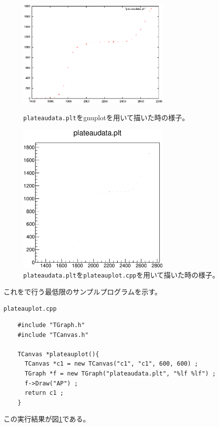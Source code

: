 \begin{figure}[htbp]
 \begin{minipage}{0.47\hsize}
  \begin{center}
   \includegraphics[width = 75mm]{./picture/plateaugnuplot.eps}
  \end{center}
  \caption{\texttt{plateaudata.plt}をgnuplotを用いて描いた時の様子。}
  \label{Fig:plateaugnuplot}
 \end{minipage}
 \begin{minipage}{0.53\hsize}
  \begin{center}
   \includegraphics[width = 75mm]{./picture/plateaucanvas1.eps}
  \end{center}
  \caption{\texttt{plateaudata.plt}を\texttt{plateauplot.cpp}を用いて描いた時の様子。}
  \label{Fig:plateaucanvas1}
 \end{minipage}
\end{figure}

これを\ROOT で行う最低限のサンプルプログラムを示す。
\begin{itembox}{\texttt{plateauplot.cpp}}
\begin{verbatim}
	#include "TGraph.h"
	#include "TCanvas.h"

	TCanvas *plateauplot(){
	  TCanvas *c1 = new TCanvas("c1", "c1", 600, 600) ;
	  TGraph *f = new TGraph("plateaudata.plt", "%lf %lf") ;
	  f->Draw("AP") ;
	  return c1 ;
	}
\end{verbatim}
\end{itembox}
この実行結果が図\ref{Fig:plateaucanvas1}である。


